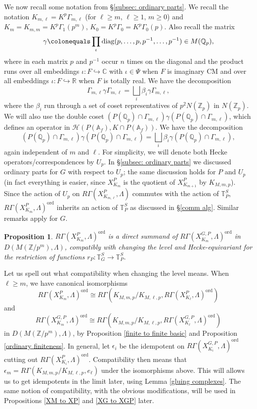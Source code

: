 \documentclass{amsart}
\newtheorem{prop}[subsubsection]{Proposition}
\theoremstyle{remark}
\numberwithin{equation}{subsection}
\newcommand{\A}{\AA}
\def\C{\CC}
\newcommand{\Q}{\QQ}
\newcommand{\R}{\RR}
\newcommand{\Z}{\ZZ}
\renewcommand{\AA}{{\mathbb A}}
\newcommand{\CC}{{\mathbb C}}
\newcommand{\QQ}{{\mathbb Q}}
\newcommand{\RR}{{\mathbb R}}
\newcommand{\ZZ}{{\mathbb Z}}
\newcommand{\cH}{{\mathcal H}}
\newcommand{\Zp}{\Z_p}
\newcommand{\Qp}{\Q_p}
\newcommand{\XGP}[1][m]{X^{G,P}_{K_{#1}}}
\newcommand{\XP}[1][m]{X^{P}_{K_{#1}}}
\DeclareMathOperator{\ord}{ord}
\newcommand{\defeq}{\colonequals}
\renewcommand{\(}{\left(}
\renewcommand{\)}{\right)}
\begin{document}
\medskip

We now recall some notation from \S \ref{subsec: ordinary parts}. We recall the notation $K_{m,\ell} = K^p \Gamma_{m,\ell}$ (for $\ell\geq m$, $\ell \geq 1$, $m\geq 0$) and $K_m = K_{m,m} = K^p \Gamma_1(p^m)$, $K_0 = K^p\Gamma_0 = K^p \Gamma_0(p)$. Also recall the matrix
\[
\gamma \defeq \prod_{\iota} \mathrm{diag}(p,\dots,p,p^{-1},\dots,p^{-1})\in M(\Q_p),
\]
where in each matrix $p$ and $p^{-1}$ occur $n$ times on the diagonal and the product runs over all embeddings $\iota \colon F\hookrightarrow \C$ with $\iota\in \Psi$ when $F$ is imaginary CM and over all embeddings $\iota \colon F\hookrightarrow \R$ when $F$ is totally real. We have the decomposition
\[
\Gamma_{m,\ell} \gamma \Gamma_{m,\ell} = \bigsqcup_i \beta_i \gamma \Gamma_{m,\ell},
\]
where the $\beta_i$ run through a set of coset representatives of $p^2 N(\Zp)$ in $N(\Zp)$. We will also use the double coset $(P(\Qp) \cap \Gamma_{m,\ell}) \gamma (P(\Qp) \cap \Gamma_{m,\ell})$, which defines an operator in $\cH(P(\A_f),K \cap P(\A_f))$. We have the decomposition
\[
(P(\Qp) \cap \Gamma_{m,\ell}) \gamma (P(\Qp) \cap \Gamma_{m,\ell}) = \bigsqcup_i \beta_i \gamma (P(\Qp) \cap \Gamma_{m,\ell}),
\] 
again independent of $m$ and $\ell$. For simplicity, we will denote both Hecke operators/correspondences by $U_p$. In \S \ref{subsec: ordinary parts} we discussed ordinary parts for $G$ with respect to $U_p$; the same discussion holds for $P$ and $U_p$ (in fact everything is easier, since $X^P_{K_m}$ is the quotient of $X_{K_{m+1}}^P$ by $K_{M,m,p}$). Since the action of $U_p$ on $R\Gamma(X^P_{K_{m,\ell}},\Lambda)$ commutes with the action of $\mathbb{T}_P^S$, $R\Gamma(\XP,\Lambda)^{\mathrm{ord}}$ inherits an action of $\mathbb{T}_P^S$ as discussed in \S \ref{comm alg}. Similar remarks apply for $G$.
 

\begin{prop} \label{XP to XGP}
$R\Gamma(\XP,\Lambda)^{\ord}$ is a direct summand
of $R\Gamma(\XGP,\Lambda)^{\ord}$ in $D(M(\Z/p^{m}), \Lambda)$, compatibly with changing the level and Hecke-equivariant for the restriction of functions $r_P \colon \mathbb{T}^S_G \to \mathbb{T}^S_P$.
\end{prop}

Let us spell out what compatibility when changing the level means. When $\ell \geq m$, we have canonical isomorphisms 
\[
R\Gamma(\XP,\Lambda)^{\ord}\cong R\Gamma(K_{M,m,p}/K_{M,\ell,p}, R\Gamma(\XP[\ell],\Lambda)^\mathrm{ord})
\]
and 
\[
R\Gamma(\XGP,\Lambda)^{\ord}\cong R\Gamma(K_{M,m,p}/K_{M,\ell,p}, R\Gamma(\XGP[\ell],\Lambda)^\mathrm{ord})
\]
in $D(M(\Z/p^{m}), \Lambda)$, by Proposition \ref{finite to finite basic} and Proposition \ref{ordinary finiteness}. In general, let $\epsilon_i$ be the idempotent on $R\Gamma(\XGP[i],\Lambda)^\mathrm{ord}$ cutting out $R\Gamma(\XP[i],\Lambda)^\mathrm{ord}$. Compatibility then means that $\epsilon_m = R\Gamma(K_{M,m,p}/K_{M,\ell,p},e_\ell)$ under the isomorphisms above. This will allows us to get idempotents in the limit later, using Lemma \ref{gluing complexes}. The same notion of compatibility, with the obvious modifications, will be used in Propositions \ref{XM to XP} and \ref{XG to XGP} later.
\end{document}
